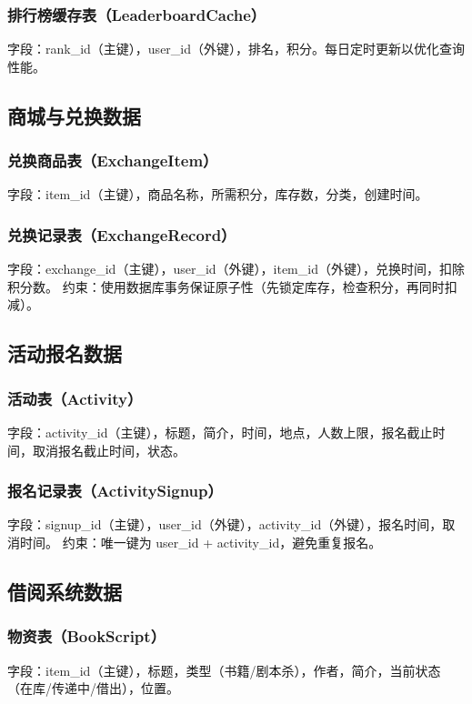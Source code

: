 \documentclass[a4paper,12pt]{article}
\begin{document}
\subsubsection{排行榜缓存表（LeaderboardCache）}
字段：rank\_id（主键），user\_id（外键），排名，积分。每日定时更新以优化查询性能。

\subsection{商城与兑换数据}
\subsubsection{兑换商品表（ExchangeItem）}
字段：item\_id（主键），商品名称，所需积分，库存数，分类，创建时间。

\subsubsection{兑换记录表（ExchangeRecord）}
字段：exchange\_id（主键），user\_id（外键），item\_id（外键），兑换时间，扣除积分数。
约束：使用数据库事务保证原子性（先锁定库存，检查积分，再同时扣减）。

\subsection{活动报名数据}
\subsubsection{活动表（Activity）}
字段：activity\_id（主键），标题，简介，时间，地点，人数上限，报名截止时间，取消报名截止时间，状态。

\subsubsection{报名记录表（ActivitySignup）}
字段：signup\_id（主键），user\_id（外键），activity\_id（外键），报名时间，取消时间。
约束：唯一键为 user\_id + activity\_id，避免重复报名。

\subsection{借阅系统数据}
\subsubsection{物资表（BookScript）}
字段：item\_id（主键），标题，类型（书籍/剧本杀），作者，简介，当前状态（在库/传递中/借出），位置。
\end{document}
